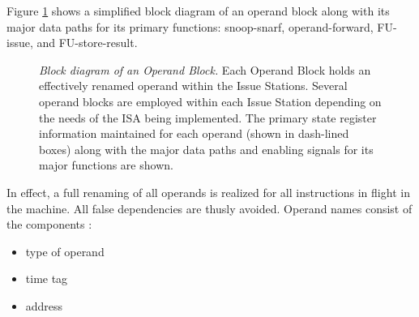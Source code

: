 \documentclass[10pt,twocolumn,dvips]{article}
\begin{document}
Figure \ref{fig:operand} shows a simplified block diagram of
an operand block along with its major data paths for its
primary functions: snoop-snarf, operand-forward, FU-issue,
and FU-store-result.
%
\begin{figure}
\caption{{\em Block diagram of an Operand Block.} 
\small{
Each Operand Block holds an effectively renamed 
operand within the Issue Stations.
Several operand blocks are employed within each Issue Station
depending on the needs of the ISA being implemented.
The primary state register information maintained for each operand (shown in
dash-lined boxes)
along with the major data paths and enabling signals for
its major functions are shown.
}
}
\label{fig:operand}
\end{figure}
%

In effect, a full renaming of
all operands is realized for all instructions
in flight in the machine.  
All false dependencies are thusly avoided.
Operand names consist of the components :
%
\begin{itemize}
\vspace{-0.10in}
\item{type of operand}
\vspace{-0.10in}
\item{time tag}
\vspace{-0.10in}
\item{address}
\vspace{-0.10in}
\end{itemize}   
%
%
%
\end{document}
